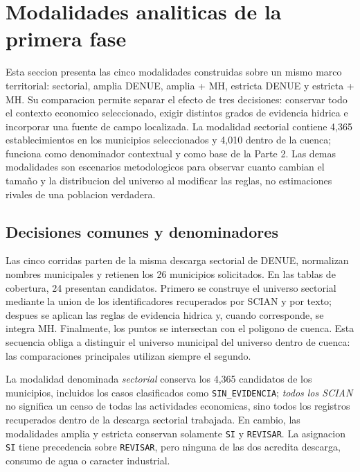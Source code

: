 \documentclass[11pt,letterpaper]{article}
\begin{document}
\section{Modalidades analiticas de la primera fase}

Esta seccion presenta las cinco modalidades construidas sobre un mismo marco territorial: sectorial, amplia DENUE, amplia + MH, estricta DENUE y estricta + MH. Su comparacion permite separar el efecto de tres decisiones: conservar todo el contexto economico seleccionado, exigir distintos grados de evidencia hidrica e incorporar una fuente de campo localizada. La modalidad sectorial contiene 4,365 establecimientos en los municipios seleccionados y 4,010 dentro de la cuenca; funciona como denominador contextual y como base de la Parte 2. Las demas modalidades son escenarios metodologicos para observar cuanto cambian el tamaño y la distribucion del universo al modificar las reglas, no estimaciones rivales de una poblacion verdadera.

\subsection{Decisiones comunes y denominadores}

Las cinco corridas parten de la misma descarga sectorial de DENUE, normalizan nombres municipales y retienen los 26 municipios solicitados. En las tablas de cobertura, 24 presentan candidatos. Primero se construye el universo sectorial mediante la union de los identificadores recuperados por SCIAN y por texto; despues se aplican las reglas de evidencia hidrica y, cuando corresponde, se integra MH. Finalmente, los puntos se intersectan con el poligono de cuenca. Esta secuencia obliga a distinguir el universo municipal del universo dentro de cuenca: las comparaciones principales utilizan siempre el segundo.

La modalidad denominada \emph{sectorial} conserva los 4,365 candidatos de los municipios, incluidos los casos clasificados como \texttt{SIN\_EVIDENCIA}; \emph{todos los SCIAN} no significa un censo de todas las actividades economicas, sino todos los registros recuperados dentro de la descarga sectorial trabajada. En cambio, las modalidades amplia y estricta conservan solamente \texttt{SI} y \texttt{REVISAR}. La asignacion \texttt{SI} tiene precedencia sobre \texttt{REVISAR}, pero ninguna de las dos acredita descarga, consumo de agua o caracter industrial.
\end{document}
